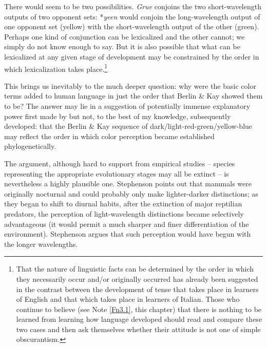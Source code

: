 There would seem to be two possibilities. \textit{Grue} conjoins the two short-wavelength outputs of two opponent sets: *\textit{yeen} would conjoin the long-wavelength output of one opponent set (yellow) with the short-wavelength output of the other (green). Perhaps one kind of conjunction can be lexicalized and the other cannot; we simply do not know enough to say. But it is also possible that what can be lexicalized at any given stage of development may be constrained by the order in which lexicalization takes place.\footnote{That the nature of linguistic facts can be determined by the order in which they necessarily occur and/or originally occurred has already been suggested in the contrast between the development of tense that takes place in learners of English and that which takes place in learners of Italian. Those who continue to believe (see Note \ref{Fn3.1}, this chapter) that there is nothing to be learned from learning how language developed should read and compare these two cases and then ask themselves whether their attitude is not one of simple obscurantism.}

This brings us inevitably to the much deeper question: why were the basic color terms added to human language in just the order that Berlin \& Kay showed them to be? The answer may lie in a suggestion of potentially immense explanatory power first made by \citet{Stephenson1973} but not, to the best of my knowledge, subsequently developed: that the Berlin \& Kay sequence of dark/light-red-green/yellow-blue may reflect the order in which color perception became established phylogenetically.

The argument, although hard to support from empirical studies -- species representing the appropriate evolutionary stages may all be extinct -- is nevertheless a highly plausible one. Stephenson points out that mammals were originally nocturnal and could probably only make lighter-darker distinctions; as they began to shift to diurnal habits, after the extinction of major reptilian predators, the perception of light-wavelength distinctions became selectively advantageous (it
would permit a much sharper and finer differentiation of the environment). Stephenson argues that such perception would have begun with the longer wavelengths.

